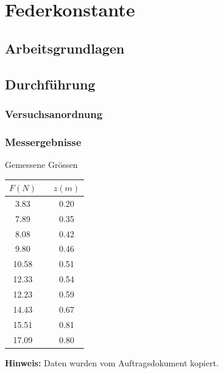 \section{Federkonstante}

\subsection{Arbeitsgrundlagen}

\subsection{Durchf\"uhrung}

\subsubsection*{Versuchsanordnung}

\subsubsection*{Messergebnisse}

\begin{center}
    \begin{threeparttable}
        \caption{Gemessene Gr\"ossen}
        \begin{tabular}{ccc}
            \toprule
            $F (N)$ & \hspace{12mm} & $z (m)$ \\
            \midrule
            3.83  & & 0.20 \\
            7.89  & & 0.35 \\
            8.08  & & 0.42 \\
            9.80  & & 0.46 \\
            10.58 & & 0.51 \\
            12.33 & & 0.54 \\
            12.23 & & 0.59 \\
            14.43 & & 0.67 \\
            15.51 & & 0.81 \\
            17.09 & & 0.80 \\
            \bottomrule
        \end{tabular}
        \begin{tablenotes}
            \small
            \item \textbf{Hinweis:} Daten wurden vom Auftragsdokument kopiert.
        \end{tablenotes}
    \end{threeparttable}
\end{center}

